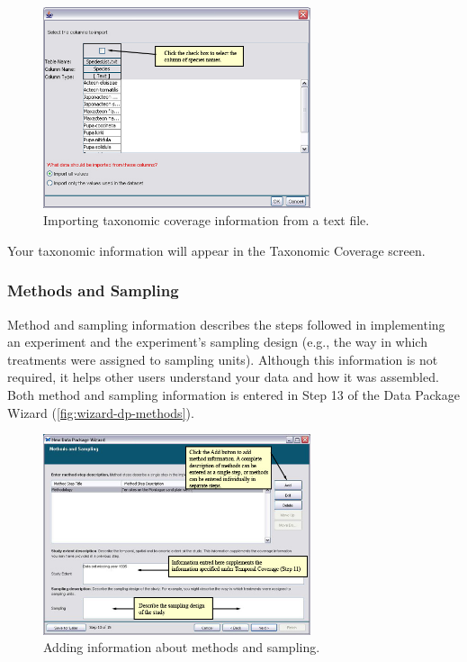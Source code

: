 \begin{figure}
  \centering
    \includegraphics[width=0.7\textwidth]{images/wizard-dp-taxonomic-import.jpg}
  \caption{Importing taxonomic coverage information from a text file.}
  \label{fig:wizard-dp-taxonomic-import}
\end{figure}

Your taxonomic information will appear in the Taxonomic Coverage screen.

\subsubsection{Methods and Sampling} \label{sec:wizard-dp-methods}

Method and sampling information describes the steps followed in
implementing an experiment and the experiment's sampling design (e.g.,
the way in which treatments were assigned to sampling units). Although
this information is not required, it helps other users understand your
data and how it was assembled. Both method and sampling information is
entered in Step 13 of the Data Package Wizard
(\autoref{fig:wizard-dp-methods}).

\begin{figure}
  \centering
    \includegraphics[width=0.7\textwidth]{images/wizard-dp-methods.jpg}
  \caption{Adding information about methods and sampling.}
  \label{fig:wizard-dp-methods}
\end{figure}

